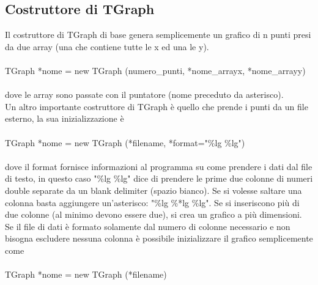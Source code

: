 \documentclass[10pt,a4paper]{article}
\begin{document}
\subsection{Costruttore di TGraph}
Il costruttore di TGraph di base genera semplicemente un grafico di n punti presi da due array (una che contiene tutte le x ed una le y). \\\\
TGraph *nome = new TGraph (numero\_punti, *nome\_arrayx, *nome\_arrayy)\\\\
dove le array sono passate con il puntatore (nome preceduto da asterisco).\\
Un altro importante costruttore di TGraph è quello che prende i punti da un file esterno, la sua inizializzazione è \\\\
TGraph *nome = new TGraph (*filename, *format="\%lg \%lg") \\\\
dove il format fornisce informazioni al programma su come prendere i dati dal file di testo, in questo caso "\%lg \%lg" dice di prendere le prime due colonne di numeri double separate da un blank delimiter (spazio bianco). Se si volesse saltare una colonna basta aggiungere un'asterisco: "\%lg \%*lg \%lg". Se si inseriscono più di due colonne (al minimo devono essere due), si crea un grafico a più dimensioni. Se il file di dati è formato solamente dal numero di colonne necessario e non bisogna escludere nessuna colonna è possibile inizializzare il grafico semplicemente come 
\\\\
TGraph *nome = new TGraph (*filename) \\\\
\end{document}

